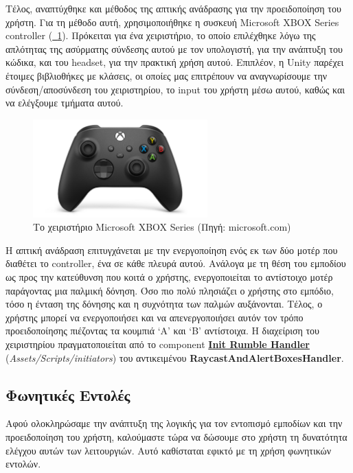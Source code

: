 Τέλος, αναπτύχθηκε και μέθοδος της απτικής ανάδρασης για την προειδοποίηση του χρήστη. Για τη μέθοδο αυτή, χρησιμοποιήθηκε η συσκευή Microsoft XBOX Series controller (\hyperref[fig:xboxController]{\schema~\ref*{fig:xboxController}}). Πρόκειται για ένα χειριστήριο, το οποίο επιλέχθηκε λόγω της απλότητας της ασύρματης σύνδεσης αυτού με τον υπολογιστή, για την ανάπτυξη του κώδικα, και του headset, για την πρακτική χρήση αυτού. 
Επιπλέον, η Unity παρέχει έτοιμες βιβλιοθήκες με κλάσεις, οι οποίες μας επιτρέπουν να αναγνωρίσουμε την σύνδεση/αποσύνδεση του χειριστηρίου, το input του χρήστη μέσω αυτού, καθώς και να ελέγξουμε τμήματα αυτού.
\begin{figure}[!h]
    \centering
    \includegraphics[width=0.6\textwidth]{images/xboxController.jpg}
    \caption[Το χειριστήριο Microsoft XBOX Series]{Το χειριστήριο Microsoft XBOX Series {\footnotesize(Πηγή: microsoft.com)}}\label{fig:xboxController}
\end{figure}
Η απτική ανάδραση επιτυγχάνεται με την ενεργοποίηση ενός εκ των δύο μοτέρ που διαθέτει το controller, ένα σε κάθε πλευρά αυτού. Ανάλογα με τη θέση του εμποδίου ως προς την κατεύθυνση που κοιτά ο χρήστης, ενεργοποιείται το αντίστοιχο μοτέρ παράγοντας μια παλμική δόνηση. Όσο πιο πολύ πλησιάζει ο χρήστης στο εμπόδιο, τόσο η ένταση της δόνησης και η συχνότητα των παλμών αυξάνονται. Τέλος, ο χρήστης μπορεί να ενεργοποιήσει και να απενεργοποιήσει αυτόν τον τρόπο προειδοποίησης πιέζοντας τα κουμπιά `A' και `B' αντίστοιχα. Η διαχείριση του χειριστηρίου πραγματοποιείται από το component \hyperref[lst:initRumbleHandler]{\textbf{Init Rumble Handler}} (\textit{Assets/Scripts/initiators}) του αντικειμένου \textbf{RaycastAndAlertBoxesHandler}.

\subsection{Φωνητικές Εντολές}\label{subsec:developVoiceCommands}
Αφού ολοκληρώσαμε την ανάπτυξη της λογικής για τον εντοπισμό εμποδίων και την προειδοποίηση του χρήστη, καλούμαστε τώρα να δώσουμε στο χρήστη τη δυνατότητα ελέγχου αυτών των λειτουργιών. Αυτό καθίσταται εφικτό με τη χρήση φωνητικών εντολών.

